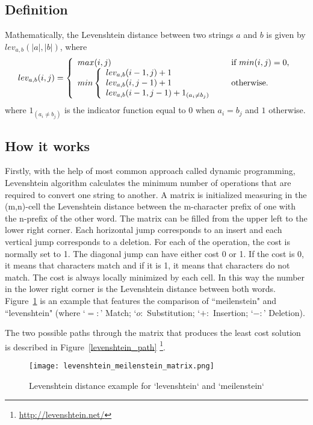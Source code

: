		\subsection{Definition}
			Mathematically, the Levenshtein distance between two strings \(a\) and \(b\) is given by \(lev_{a,b}(|a|,|b|)\), where
			\[ lev_{a,b}(i,j) = \left\{ 
				\begin{array}{l l}
					max(i,j) & \quad \text{if \(min(i,j) = 0\),}\\
					min \left\{
					\begin{array}{l}
						lev_{a,b}(i-1,j) + 1\\
						lev_{a,b}(i,j-1) + 1\\
						lev_{a,b}(i-1,j-1) + 1_{(a_i \neq b_j)}
					\end{array} \right.& \quad \text{otherwise.}
				\end{array} \right.\]
			where \(1_{(a_i \neq b_j)}\) is the indicator function equal to \(0\) when \(a_i = b_j\) and \(1\) otherwise.
		
		\subsection{How it works}
			Firstly, with the help of most common approach called dynamic programming, Levenshtein algorithm calculates the minimum number of operations that are required to convert one string to another. A matrix is initialized measuring in the (m,n)-cell the Levenshtein distance between the m-character prefix of one with the n-prefix of the other word. The matrix can be filled from the upper left to the lower right corner. Each horizontal jump corresponds to an insert and each vertical jump corresponds to a deletion. For each of the operation, the cost is normally set to 1. The diagonal jump can have either cost 0 or 1. If the cost is 0, it means that characters match and if it is 1, it means that characters do not match. The cost is always locally minimized by each cell. In this way the number in the lower right corner is the Levenshtein distance between both words. Figure~\ref{levenshtein_matrix} is an example that features the comparison of ``meilenstein" and ``levenshtein" (where `\(= :\)' Match; `\(o :\) Substitution; `\(+ :\) Insertion; `\(- :\)' Deletion).
			
			The two possible paths through the matrix that produces the least cost solution is described in Figure~\ref{levenshtein_path} \footnote{\url{http://levenshtein.net/}}.
			
			\begin{figure}[h!]
				\centering
				\texttt{[image: levenshtein\_meilenstein\_matrix.png]}
				\caption{Levenshtein distance example for `levenshtein` and `meilenstein` \label{levenshtein_matrix}}
			\end{figure}
			
